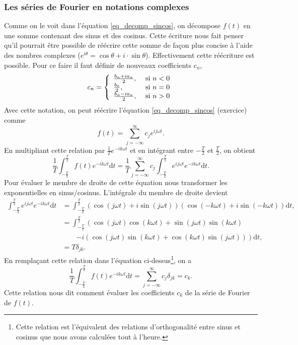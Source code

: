 \documentclass[a4paper,12pt]{book}
\newcommand{\dd}{\mathrm{d}}
\begin{document}
\subsubsection{Les séries de Fourier en notations complexes}
Comme on le voit dans l'équation \eqref{eq_decomp_sincos}, on décompose $f(t)$ en une somme contenant des sinus et des cosinus. 
Cette écriture nous fait penser qu'il pourrait être possible de réécrire cette somme de façon plus concise à l'aide des nombres complexes
($e^{i\theta}=\cos\theta+i\cdot\sin\theta$). Effectivement cette réécriture est possible. Pour ce faire il faut définir 
de nouveaux coefficients $c_n$,
\begin{equation}
 c_n=\left\{\begin{array}{ll}
                \frac{b_n+ia_n}{2}, & $\mbox{ si }$n<0\\
                \frac{b_0}{2},      & $\mbox{ si }$n=0\\
                \frac{b_n-ia_n}{2}, & $\mbox{ si }$n>0
               \end{array}\right.
\end{equation}
Avec cette notation, on peut réécrire l'équation \eqref{eq_decomp_sincos} (exercice) comme
\begin{equation}
 f(t)=\sum_{j=-\infty}^\infty c_je^{ij\omega t}.
\end{equation}
En multipliant cette relation par $\frac{1}{T}e^{-ik\omega t}$ et en intégrant entre $-\frac{T}{2}$ et $\frac{T}{2}$, 
on obtient
\begin{equation}
 \frac{1}{T}\int_{-\frac{T}{2}}^{\frac{T}{2}}f(t)e^{-ik\omega t}\dd t=\frac{1}{T}\sum_{j=-\infty}^\infty c_j\int_{-\frac{T}{2}}^{\frac{T}{2}}e^{ij\omega t}e^{-ik\omega t}\dd t.
\end{equation}
Pour évaluer le membre de droite de cette équation nous transformer les exponentielles en sinus/cosinus. L'intégrale du membre de droite devient
\begin{align}
\int_{-\frac{T}{2}}^{\frac{T}{2}}e^{ij\omega t}e^{-ik\omega t}\dd t&=\int_{-\frac{T}{2}}^{\frac{T}{2}}\left(\cos(j\omega t)+i\sin(j\omega t)\right)\left(\cos(-k\omega t)+i\sin(-k\omega t)\right)\dd t,\nonumber\\
&=\int_{-\frac{T}{2}}^{\frac{T}{2}}\left(\cos(j\omega t)\cos(k\omega t)+\sin(j\omega t)\sin(k\omega t)\right.\nonumber\\
&\quad\quad\left.-i(\cos(j\omega t)\sin(k\omega t)+\cos(k\omega t)\sin(j\omega t))\right)\dd t,\nonumber\\
&=T\delta_{jk}.
\end{align}
En remplaçant cette relation dans l'équation ci-dessus\footnote{Cette relation est l'équivalent des relations d'orthogonalité entre sinus et cosinus que nous avons calculées tout à l'heure.}, 
on a
\begin{equation}
 \frac{1}{T}\int_{-\frac{T}{2}}^{\frac{T}{2}}f(t)e^{-ik\omega t}\dd t=\sum_{j=-\infty}^\infty c_j\delta_{jk}=c_k.\label{eq_ck}
\end{equation}
Cette relation nous dit comment évaluer les coefficients $c_k$ de la série de Fourier de $f(t)$.
\end{document}
